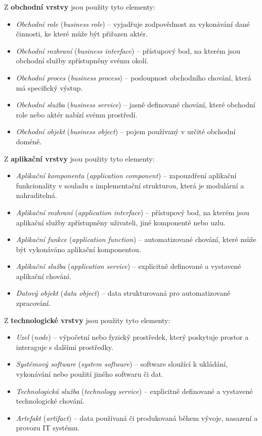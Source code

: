 Z \textbf{obchodní vrstvy} jsou použity tyto elementy:
\begin{itemize}
  \item \textit{Obchodní role} (\textit{business role}) -- vyjadřuje zodpovědnost za vykonávání dané činnosti, ke které může být přiřazen aktér.
  \item \textit{Obchodní rozhraní} (\textit{business interface}) -- přístupový bod, na kterém jsou obchodní služby zpřístupněny svému okolí.
  \item \textit{Obchodní proces} (\textit{business process}) -- posloupnost obchodního chování, která má specifický výstup.
  \item \textit{Obchodní služba} (\textit{business service}) -- jasně definované chování, které obchodní role nebo aktér nabízí svému prostředí.
  \item \textit{Obchodní objekt} (\textit{business object}) -- pojem používaný v určité obchodní doméně.
\end{itemize}

Z \textbf{aplikační vrstvy} jsou použity tyto elementy:
\begin{itemize}
  \item \textit{Aplikační komponenta} (\textit{application component}) -- zapouzdření aplikační funkcionality v souladu s implementační strukturou, která je modulární a nahraditelná.
  \item \textit{Aplikační rozhraní} (\textit{application interface}) -- přístupový bod, na kterém jsou aplikační služby zpřístupněny uživateli, jiné komponentě nebo uzlu.
  \item \textit{Aplikační funkce} (\textit{application function}) -- automatizované chování, které může být vykonáváno aplikační komponentou.
  \item \textit{Aplikační služba} (\textit{application service}) -- explicitně definované a vystavené aplikační chování.
  \item \textit{Datový objekt} (\textit{data object}) -- data strukturovaná pro automatizované zpracování.
\end{itemize}

Z \textbf{technologické vrstvy} jsou použity tyto elementy:
\begin{itemize}
  \item \textit{Uzel} (\textit{node}) -- výpočetní nebo fyzický prostředek, který poskytuje prostor a interaguje s dalšími prostředky.
  \item \textit{Systémový software} (\textit{system software}) -- software sloužící k ukládání, vykonávání nebo použití jiného softwaru či dat.
  \item \textit{Technologická služba} (\textit{technology service}) -- explicitně definované a vystavené technologické chování.
  \item \textit{Artefakt} (\textit{artifact}) -- data používaná či produkovaná během vývoje, nasazení a provozu IT systému.
\end{itemize}

